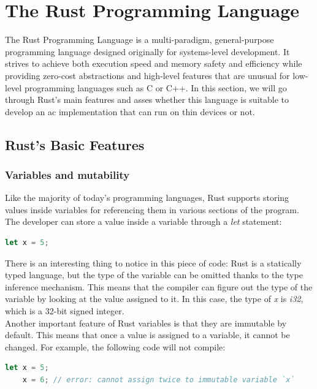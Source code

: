 \section{The Rust Programming Language}
The Rust Programming Language\cite{002} is a multi-paradigm, general-purpose programming language designed originally for systems-level development. It strives to achieve both execution
speed and memory safety and efficiency while providing zero-cost abstractions and high-level features that are unusual for low-level programming languages such as C or C++.
In this section, we will go through Rust's main features and asses whether this language is suitable to develop an \acs{ac} implementation that can run on thin devices or not.

\subsection{Rust's Basic Features}
\subsubsection{Variables and mutability}
Like the majority of today's programming languages, Rust supports storing values inside variables for referencing them in various sections of the program. \\
The developer can store a value inside a variable through a \textit{let} statement:

\begin{lstlisting}[language=Rust]
    let x = 5;
\end{lstlisting}

There is an interesting thing to notice in this piece of code: Rust is a statically typed language, but the type of the variable can be omitted thanks to the type inference mechanism. This means that the compiler can figure out the type of the variable by looking at the value assigned to it. In this case, the type of \textit{x} is \textit{i32}, which is a 32-bit signed integer. \\

Another important feature of Rust variables is that they are immutable by default. This means that once a value is assigned to a variable, it cannot be changed.
For example, the following code will not compile:

\begin{lstlisting}[language=Rust]
    let x = 5;
    x = 6; // error: cannot assign twice to immutable variable `x`
\end{lstlisting}

